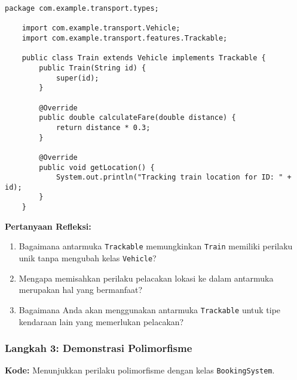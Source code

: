 \begin{lstlisting}[style=JavaStyle, caption={Train.java}]
	package com.example.transport.types;
	
	import com.example.transport.Vehicle;
	import com.example.transport.features.Trackable;
	
	public class Train extends Vehicle implements Trackable {
		public Train(String id) {
			super(id);
		}
		
		@Override
		public double calculateFare(double distance) {
			return distance * 0.3;
		}
		
		@Override
		public void getLocation() {
			System.out.println("Tracking train location for ID: " + id);
		}
	}
\end{lstlisting}

\textbf{Pertanyaan Refleksi:}
\begin{enumerate}
	\item Bagaimana antarmuka \texttt{Trackable} memungkinkan \texttt{Train} memiliki perilaku unik tanpa mengubah kelas \texttt{Vehicle}?
	\begin{tcolorbox}[colback=white, colframe=black,  width=\linewidth, height=3cm, boxrule=1pt, sharp corners]
	\end{tcolorbox}
	\item Mengapa memisahkan perilaku pelacakan lokasi ke dalam antarmuka merupakan hal yang bermanfaat?
	\begin{tcolorbox}[colback=white, colframe=black,  width=\linewidth, height=3cm, boxrule=1pt, sharp corners]
	\end{tcolorbox}
	\item Bagaimana Anda akan menggunakan antarmuka \texttt{Trackable} untuk tipe kendaraan lain yang memerlukan pelacakan?
	\begin{tcolorbox}[colback=white, colframe=black,  width=\linewidth, height=3cm, boxrule=1pt, sharp corners]
	\end{tcolorbox}
\end{enumerate}

\subsubsection{Langkah 3: Demonstrasi Polimorfisme}

\textbf{Kode:} Menunjukkan perilaku polimorfisme dengan kelas \texttt{BookingSystem}.

